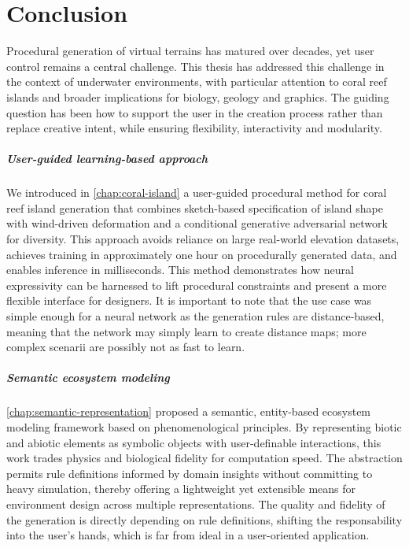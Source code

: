 \chapter{Conclusion}




Procedural generation of virtual terrains has matured over decades, yet user control remains a central challenge. This thesis has addressed this challenge in the context of underwater environments, with particular attention to coral reef islands and broader implications for biology, geology and graphics. The guiding question has been how to support the user in the creation process rather than replace creative intent, while ensuring flexibility, interactivity and modularity.

\paragraph{User-guided learning-based approach} We introduced in \cref{chap:coral-island} a user-guided procedural method for coral reef island generation that combines sketch-based specification of island shape with wind-driven deformation and a conditional generative adversarial network for diversity. This approach avoids reliance on large real-world elevation datasets, achieves training in approximately one hour on procedurally generated data, and enables inference in milliseconds. This method demonstrates how neural expressivity can be harnessed to lift procedural constraints and present a more flexible interface for designers. It is important to note that the use case was simple enough for a neural network as the generation rules are distance-based, meaning that the network may simply learn to create distance maps; more complex scenarii are possibly not as fast to learn.

\paragraph{Semantic ecosystem modeling} \cref{chap:semantic-representation} proposed a semantic, entity-based ecosystem modeling framework based on phenomenological principles. By representing biotic and abiotic elements as symbolic objects with user-definable interactions, this work trades physics and biological fidelity for computation speed. The abstraction permits rule definitions informed by domain insights without committing to heavy simulation, thereby offering a lightweight yet extensible means for environment design across multiple representations. The quality and fidelity of the generation is directly depending on rule definitions, shifting the responsability into the user's hands, which is far from ideal in a user-oriented application.

